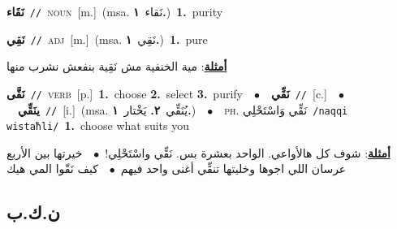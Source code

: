 \documentclass[10pt,a4paper,twoside]{article} %
\begin{document}
\begin{multicols}{2}
{\setlength\topsep{0pt}\textbf{\foreignlanguage{arabic}{نَقَاء}}\ {\color{gray}\texttt{//}\color{black}}\ \textsc{noun}\ [m.]\ \color{gray}(msa. \foreignlanguage{arabic}{نَقاء}~\foreignlanguage{arabic}{\textbf{١.}})\color{black}\ \textbf{1.}~purity\ } \vspace{2mm}

{\setlength\topsep{0pt}\textbf{\foreignlanguage{arabic}{نَقِي}}\ {\color{gray}\texttt{//}\color{black}}\ \textsc{adj}\ [m.]\ \color{gray}(msa. \foreignlanguage{arabic}{نَقِي}~\foreignlanguage{arabic}{\textbf{١.}})\color{black}\ \textbf{1.}~pure\  \begin{flushright}\color{gray}\foreignlanguage{arabic}{\textbf{\underline{\foreignlanguage{arabic}{أمثلة}}}: مية الخنفية مش نَقِية بنفعش نشرب منها}\end{flushright}\color{black}} \vspace{2mm}

{\setlength\topsep{0pt}\textbf{\foreignlanguage{arabic}{نَقَّى}}\ {\color{gray}\texttt{//}\color{black}}\ \textsc{verb}\ [p.]\ \textbf{1.}~choose  \textbf{2.}~select  \textbf{3.}~purify\ \ $\bullet$\ \ \setlength\topsep{0pt}\textbf{\foreignlanguage{arabic}{نَقِّي}}\ {\color{gray}\texttt{//}\color{black}}\ [c.]\ \ $\bullet$\ \ \setlength\topsep{0pt}\textbf{\foreignlanguage{arabic}{ينَقِّي}}\ {\color{gray}\texttt{//}\color{black}}\ [i.]\ \color{gray}(msa. \foreignlanguage{arabic}{يُنَقِّي}~\foreignlanguage{arabic}{\textbf{٢.}}  \foreignlanguage{arabic}{يَخْتار}~\foreignlanguage{arabic}{\textbf{١.}})\color{black}\ \ $\bullet$\ \ \textsc{ph.} \color{gray} \foreignlanguage{arabic}{نَقِّي وَاسْتَحْلِي}\color{black}\ {\color{gray}\texttt{/{\sffamily naqqi wistaħli}/}\color{black}}\ \textbf{1.}~choose what suits you\  \begin{flushright}\color{gray}\foreignlanguage{arabic}{\textbf{\underline{\foreignlanguage{arabic}{أمثلة}}}: شوف كل هالأواعي. الواحد بعشرة بس. نَقِّي واسْتَحْلِي!\ $\bullet$\ \  خيرتها بين الأربع عرسان اللي اجوها وخليتها تنقِّي أغنى واحد فيهم\ $\bullet$\ \  كيف نَقّوا المي هيك}\end{flushright}\color{black}} \vspace{2mm}

\vspace{-3mm}
\subsection*{\color{blue}\foreignlanguage{arabic}{ن.ك.ب}\color{blue}{}} 


\end{multicols}
\end{document}

